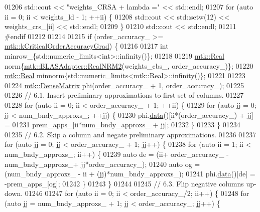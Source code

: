 \begin{DoxyCode}
{{01206   std::cout << \textcolor{stringliteral}{"weights\_CRSA + lambda ="} << std::endl;
01207   \textcolor{keywordflow}{for} (\textcolor{keyword}{auto} ii = 0; ii < weights\_ld - 1; ++ii) \{
01208     std::cout << std::setw(12) << weights\_crs\_[ii] << std::endl;
01209   \}
01210   std::cout << std::endl;
01211 \textcolor{preprocessor}{  #endif}
01212 
01214 
01215   \textcolor{keywordflow}{if} (order\_accuracy\_ >= \hyperlink{group__c01-roots_ga295dd2f403c775ecd942c22b5a777496}{mtk::kCriticalOrderAccuracyGrad}) \{
01216 
01217     \textcolor{keywordtype}{int} minrow\_\{std::numeric\_limits<int>::infinity()\};
01218 
01219     \hyperlink{group__c01-roots_gac080bbbf5cbb5502c9f00405f894857d}{mtk::Real} norm\{\hyperlink{classmtk_1_1BLASAdapter_ab92440888b730863244c5d9479c11aca}{mtk::BLASAdapter::RealNRM2}(weights\_cbs\_,
      order\_accuracy\_)\};
01220     \hyperlink{group__c01-roots_gac080bbbf5cbb5502c9f00405f894857d}{mtk::Real} minnorm\{std::numeric\_limits<mtk::Real>::infinity()\};
01221 
01223 
01224     \hyperlink{classmtk_1_1DenseMatrix}{mtk::DenseMatrix} phi(order\_accuracy\_ + 1, order\_accuracy\_);
01225 
01226     \textcolor{comment}{// 6.1. Insert preliminary approximations to first set of columns.}
01227 
01228     \textcolor{keywordflow}{for} (\textcolor{keyword}{auto} ii = 0; ii < order\_accuracy\_ + 1; ++ii) \{
01229       \textcolor{keywordflow}{for} (\textcolor{keyword}{auto} jj = 0; jj < num\_bndy\_approxs\_; ++jj) \{
01230         phi.\hyperlink{classmtk_1_1DenseMatrix_a0c33b8a9e01d157c61ddbdf807c25d84}{data}()[ii*(order\_accuracy\_) + jj] =
01231           prem\_apps\_[ii*num\_bndy\_approxs\_ + jj];
01232       \}
01233     \}
01234 
01235     \textcolor{comment}{// 6.2. Skip a column and negate preliminary approximations.}
01236 
01237     \textcolor{keywordflow}{for} (\textcolor{keyword}{auto} jj = 0; jj < order\_accuracy\_ + 1; jj++) \{
01238       \textcolor{keywordflow}{for} (\textcolor{keyword}{auto} ii = 1; ii < num\_bndy\_approxs\_; ii++) \{
01239         \textcolor{keyword}{auto} de = (ii+ order\_accuracy\_ - num\_bndy\_approxs\_+ jj*order\_accuracy\_);
01240         \textcolor{keyword}{auto} og = (num\_bndy\_approxs\_ - ii + (jj)*num\_bndy\_approxs\_);
01241         phi.\hyperlink{classmtk_1_1DenseMatrix_a0c33b8a9e01d157c61ddbdf807c25d84}{data}()[de] = -prem\_apps\_[og];
01242       \}
01243     \}
01244 
01245     \textcolor{comment}{// 6.3. Flip negative columns up-down.}
01246 
01247     \textcolor{keywordflow}{for} (\textcolor{keyword}{auto} ii = 0; ii < order\_accuracy\_/2; ii++) \{
01248       \textcolor{keywordflow}{for} (\textcolor{keyword}{auto} jj = num\_bndy\_approxs\_ + 1; jj < order\_accuracy\_; jj++) \{
}}
\end{DoxyCode}
